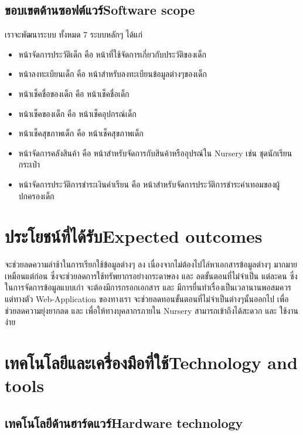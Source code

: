 \subsection{\ifcpe ขอบเขตด้านซอฟต์แวร์\else Software scope\fi}
    เราจะพัฒนาระบบ ทั้งหมด 7 ระบบหลักๆ ได้แก่
    \begin{itemize}
        \item หน้าจัดการประวัติเด็ก คือ หน้าที่ใช้จัดการเกี่ยวกับประวัติของเด็ก
        \item หน้าลงทะเบียนเด็ก คือ หน้าสำหรับลงทะเบียนข้อมูลต่างๆของเด็ก
        \item หน้าเช็คชื่อของเด็ก คือ หน้าเช็คชื่อเด็ก
        \item หน้าเช็คของเด็ก คือ หน้าเช็คอุปกรณ์เด็ก
        \item หน้าเช็คสุขภาพเด็ก คือ หน้าเช็คสุขภาพเด็ก
        \item หน้าจัดการคลังสินค้า คือ หน้าสำหรับจัดการกับสินค้าหรืออุปรณ์ใน Nursery เช่น ชุดนักเรียน กระเป๋า 
        \item หน้าจัดการประวัติการชำระเงินค่าเรียน คือ หน้าสำหรับจัดการประวัติการชำระค่าเทอมของผู้ปกครองเด็ก
    \end{itemize}

\section{\ifcpe ประโยชน์ที่ได้รับ\else Expected outcomes\fi}
จะช่วยลดความล่าช้าในการเรียกใช้ข้อมูลต่างๆ ลง    
  เนื่องจากไม่ต้องไปไล่หาเอกสารข้อมูลต่างๆ มากมาย  เหมือนแต่ก่อน ซึ่งจะช่วยลดการใช้ทรัพยากรอย่างกระดาษลง และ ลดขั้นตอนที่ไม่จำเป็น  แต่ละคน   ซึ่งในการจัดการข้อมูลแบบเก่า  จะต้องมีการกรอกเอกสาร และ มีการยื่นทำเรื่องเป็นเวลานานพอสมควร แต่ทางตัว Web-Application ของทางเรา  จะช่วยลดทอนขั้นตอนที่ไม่จำเป็นต่างๆนั้นออกไป  เพื่อช่วยลดความยุ่งยากลด และ เพื่อให้ทางบุคลากรภายใน Nursery สามารถเข้าถึงได้สะดวก และ ใช้งานง่าย

\section{\ifcpe เทคโนโลยีและเครื่องมือที่ใช้\else Technology and tools\fi}

\subsection{\ifcpe เทคโนโลยีด้านฮาร์ดแวร์\else Hardware technology\fi}


